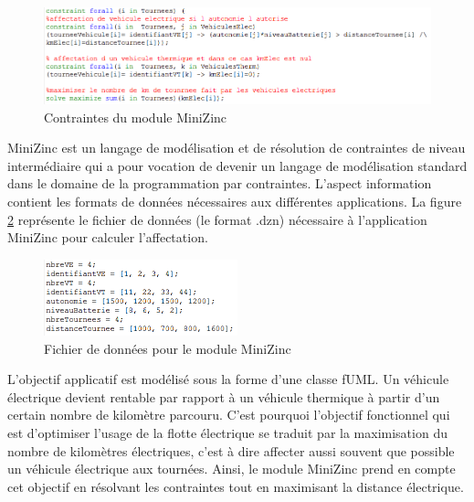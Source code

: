 \begin{figure}[!htbp]
 \begin{center}
  \includegraphics[width=1\textwidth]{figures/5_implementation/module_minizinc.png}
 \end{center}
 \caption{Contraintes du module MiniZinc}
 \label{fig:contraintesMiniZinc}
\end{figure} 

MiniZinc est un langage de modélisation et de résolution de contraintes de niveau intermédiaire qui a pour vocation de devenir un langage de modélisation standard dans le domaine de la programmation par contraintes. L'aspect information contient les formats de données nécessaires aux différentes applications. La figure \ref{fig:formatMiniZinc} représente le fichier de données (le format .dzn) nécessaire à l'application MiniZinc pour calculer l'affectation. 

\begin{figure}[!htbp]
 \begin{center}
  \includegraphics[width=0.5\textwidth]{figures/5_implementation/format_minizinc.png}
 \end{center}
 \caption{Fichier de données pour le module MiniZinc}
 \label{fig:formatMiniZinc}
\end{figure} 

L'objectif applicatif est modélisé sous la forme d'une classe fUML. Un véhicule électrique devient rentable par rapport à un véhicule thermique à partir d'un certain nombre de kilomètre parcouru. C'est pourquoi l'objectif fonctionnel qui est d'optimiser l'usage de la flotte électrique se traduit par la maximisation du nombre de kilomètres électriques, c'est à dire affecter aussi souvent que possible un véhicule électrique aux tournées. Ainsi, le module MiniZinc prend en compte cet objectif en résolvant les contraintes tout en maximisant la distance électrique. 

